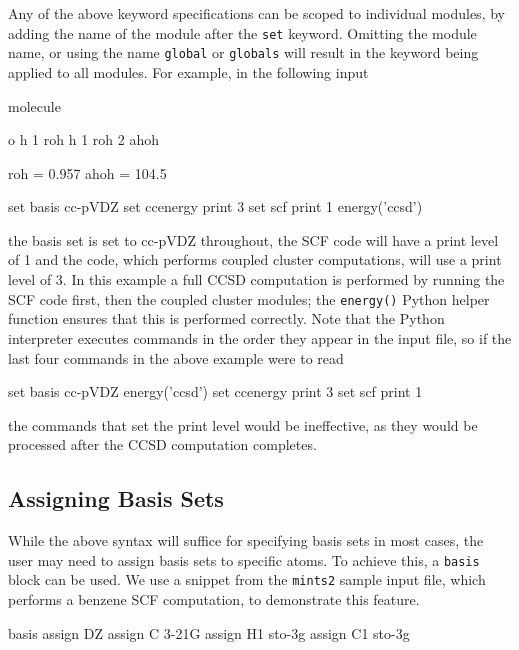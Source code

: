 Any of the above keyword specifications can be scoped to individual modules,
by adding the name of the module after the {\tt set} keyword. Omitting the module
name, or using the name {\tt global} or {\tt globals} will result in the keyword being
applied to all modules. For example, in the following input
\begin{Snippet}
molecule{
  o
  h 1 roh
  h 1 roh 2 ahoh

  roh = 0.957
  ahoh = 104.5
}

set basis cc-pVDZ
set ccenergy print 3
set scf print 1
energy('ccsd')
\end{Snippet}
the basis set is set to cc-pVDZ throughout, the SCF code will have a print
level of 1 and the \PSIccenergy code, which performs coupled cluster computations,
will use a print level of 3. In this example a full CCSD computation is
performed by running the SCF code first, then the coupled cluster modules;
the {\tt energy()} Python helper function ensures that this is performed correctly.
Note that the Python interpreter executes commands in the order they appear in
the input file, so if the last four commands in the above example were to read
\begin{Snippet}
set basis cc-pVDZ
energy('ccsd')
set ccenergy print 3
set scf print 1
\end{Snippet}
the commands that set the print level would be ineffective, as they would be
processed after the CCSD computation completes. 


\subsection{Assigning Basis Sets}
While the above syntax will suffice for specifying basis sets in most cases,
the user may need to assign basis sets to specific atoms.  To achieve this, a
{\tt basis} block can be used.  We use a snippet from the {\tt mints2} sample
input file, which performs a benzene SCF computation, to demonstrate this
feature.

\begin{Snippet}
basis {
   assign DZ
   assign C 3-21G
   assign H1 sto-3g
   assign C1 sto-3g
}
\end{Snippet}

